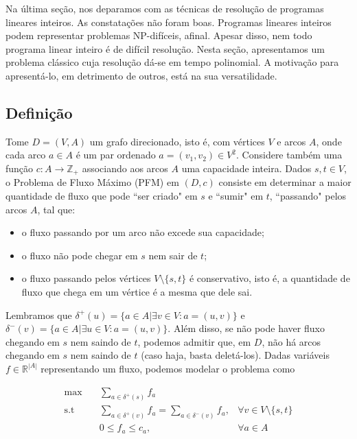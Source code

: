 \documentclass[]{article}
\numberwithin{equation}{section}
\begin{document}
Na última seção, nos deparamos com as técnicas de resolução de programas lineares inteiros.
As constatações não foram boas.
Programas lineares inteiros podem representar problemas NP-difíceis, afinal.
Apesar disso, nem todo programa linear inteiro é de difícil resolução.
Nesta seção, apresentamos um problema clássico cuja resolução dá-se em tempo polinomial.
A motivação para apresentá-lo, em detrimento de outros, está na sua versatilidade.

\subsection{Definição}

Tome $D = (V, A)$ um grafo direcionado, isto é, com vértices $V$ e arcos $A$, onde cada arco $a \in A$
é um par ordenado $a = (v_1, v_2) \in V^2$.
Considere também uma função $c : A \to \mathbb{Z}_+$ associando aos arcos $A$ uma capacidade inteira.
Dados $s, t \in V$, o Problema de Fluxo Máximo (PFM) em $(D, c)$ consiste em determinar a maior
quantidade de fluxo que pode ``ser criado" em $s$ e ``sumir" em $t$, ``passando" pelos arcos $A$, tal
que:
\begin{itemize}
  \item o fluxo passando por um arco não excede sua capacidade;
  \item o fluxo não pode chegar em $s$ nem sair de $t$;
  \item o fluxo passando pelos vértices $V \setminus \{s, t\}$ é conservativo, isto é, a quantidade de
        fluxo que chega em um vértice é a mesma que dele sai.
\end{itemize}

Lembramos que $\delta^+(u) = \{a \in A | \exists v \in V : a = (u, v)\}$ e
$\delta^-(v) = \{a \in A | \exists u \in V : a = (u, v)\}$.
Além disso, se não pode haver fluxo chegando em $s$ nem saindo de $t$, podemos admitir que, em $D$, não
há arcos chegando em $s$ nem saindo de $t$ (caso haja, basta deletá-los).
Dadas variáveis $f \in \mathbb{R}^{|A|}$ representando um fluxo, podemos modelar o problema como

\begin{align}
\max        &\quad  \sum_{a \in \delta^+(s)} f_a                      \label{startFlux}   \\
\text{s.t}  &\quad  \sum_{a \in \delta^+(v)} f_a =
                    \sum_{a \in \delta^-(v)} f_a,   & \forall v \in V \setminus \{s, t\}  \\
            &\quad  0 \leq f_a \leq c_a,            & \forall a \in A \label{boundFlux}
\end{align}
\end{document}
